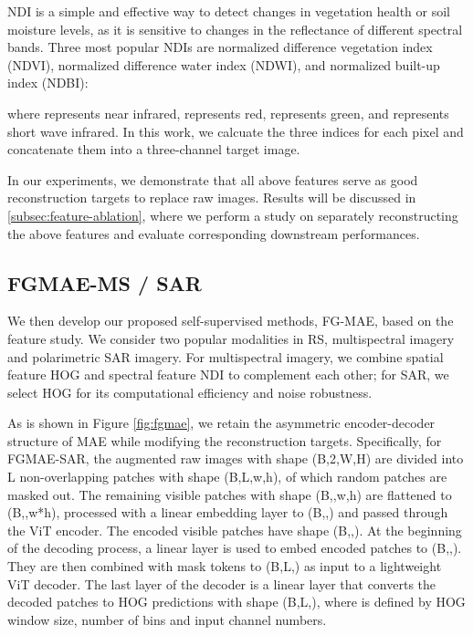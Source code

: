 \documentclass[lettersize,journal]{IEEEtran}
\begin{document}
NDI is a simple and effective way to detect changes in vegetation health or soil moisture levels, as it is sensitive to changes in the reflectance of different spectral bands. Three most popular NDIs are normalized difference vegetation index (NDVI), normalized difference water index (NDWI), and normalized built-up index (NDBI):





\noindent where  represents near infrared,  represents red,  represents green, and  represents short wave infrared. In this work, we calcuate the three indices for each pixel and concatenate them into a three-channel target image.

\vspace{0.5em}
In our experiments, we demonstrate that all above features serve as good reconstruction targets to replace raw images. Results will be discussed in \ref{subsec:feature-ablation}, where we perform a study on separately reconstructing the above features and evaluate corresponding downstream performances.

\subsection{FGMAE-MS / SAR}
\label{subsec:fgmae}

We then develop our proposed self-supervised methods, FG-MAE, based on the feature study. We consider two popular modalities in RS, multispectral imagery and polarimetric SAR imagery. For multispectral imagery, we combine spatial feature HOG and spectral feature NDI to complement each other; for SAR, we select HOG for its computational efficiency and noise robustness. 

As is shown in Figure \ref{fig:fgmae}, we retain the asymmetric encoder-decoder structure of MAE while modifying the reconstruction targets. Specifically, for FGMAE-SAR, the augmented raw images with shape (B,2,W,H) are divided into L non-overlapping patches with shape (B,L,w,h), of which  random patches are masked out. The remaining visible patches with shape (B,,w,h) are flattened to (B,,w*h), processed with a linear embedding layer to (B,,) and passed through the ViT encoder. The encoded visible patches have shape (B,,). At the beginning of the decoding process, a linear layer is used to embed encoded patches to (B,,). They are then combined with mask tokens to (B,L,) as input to a lightweight ViT decoder. The last layer of the decoder is a linear layer that converts the decoded patches to HOG predictions with shape (B,L,), where  is defined by HOG window size, number of bins and input channel numbers. 
\end{document}
